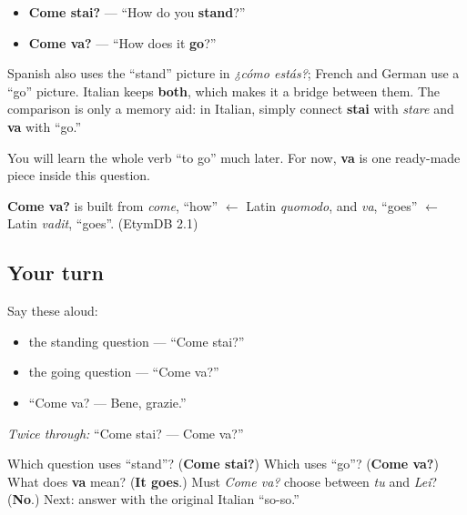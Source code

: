 \begin{grammarlens}[title={Grammar Lens: standing and going}]
\begin{itemize}
\raggedright
  \item \textbf{Come stai?} — “How do you \textbf{stand}?”
  \item \textbf{Come va?} — “How does it \textbf{go}?”
\end{itemize}

Spanish also uses the “stand” picture in \emph{¿cómo estás?}; French and German use a “go” picture. Italian keeps \textbf{both}, which makes it a bridge between them. The comparison is only a memory aid: in Italian, simply connect \textbf{stai} with \emph{stare} and \textbf{va} with “go.”

You will learn the whole verb “to go” much later. For now, \textbf{va} is one ready-made piece inside this question.
\end{grammarlens}

\begin{cousinweb}
\textbf{Come va?} is built from \emph{come}, \textquotedblleft{}how\textquotedblright{} $\leftarrow$ Latin \emph{quomodo}, and \emph{va}, \textquotedblleft{}goes\textquotedblright{} $\leftarrow$ Latin \emph{vadit}, \textquotedblleft{}goes\textquotedblright{}. (EtymDB 2.1)
\end{cousinweb}

\subsection*{Your turn}
Say these aloud:

\begin{itemize}
\raggedright
  \item the standing question — “Come stai?”
  \item the going question — “Come va?”
  \item “Come va? — Bene, grazie.”
\end{itemize}

\emph{Twice through:} “Come stai? — Come va?”

\begin{tcolorbox}[breakable,colback=teal!4,colframe=teal!35!black,title={Before you move on}]
Which question uses “stand”? (\textbf{Come stai?}) Which uses “go”? (\textbf{Come va?}) What does \textbf{va} mean? (\textbf{It goes}.) Must \emph{Come va?} choose between \emph{tu} and \emph{Lei}? (\textbf{No}.) Next: answer with the original Italian “so-so.”
\end{tcolorbox}
